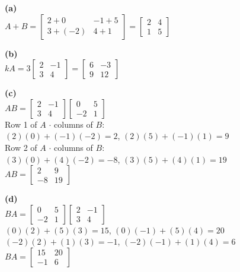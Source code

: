 \begin{solution}
\textbf{(a)} \\
$A + B = \begin{bmatrix} 2+0 & -1+5 \\ 3+(-2) & 4+1 \end{bmatrix} = \begin{bmatrix} 2 & 4 \\ 1 & 5 \end{bmatrix}$

\medskip
\textbf{(b)} \\
$kA = 3\begin{bmatrix} 2 & -1 \\ 3 & 4 \end{bmatrix} = \begin{bmatrix} 6 & -3 \\ 9 & 12 \end{bmatrix}$

\medskip
\textbf{(c)} \\
$AB = \begin{bmatrix} 2 & -1 \\ 3 & 4 \end{bmatrix}\begin{bmatrix} 0 & 5 \\ -2 & 1 \end{bmatrix}$ \\[6pt]
Row 1 of $A$ $\cdot$ columns of $B$: \\
$(2)(0)+(-1)(-2) = 2$, \quad $(2)(5)+(-1)(1) = 9$ \\[3pt]
Row 2 of $A$ $\cdot$ columns of $B$: \\
$(3)(0)+(4)(-2) = -8$, \quad $(3)(5)+(4)(1) = 19$ \\[3pt]
$AB = \begin{bmatrix} 2 & 9 \\ -8 & 19 \end{bmatrix}$

\medskip
\textbf{(d)} \\
$BA = \begin{bmatrix} 0 & 5 \\ -2 & 1 \end{bmatrix}\begin{bmatrix} 2 & -1 \\ 3 & 4 \end{bmatrix}$ \\[6pt]
$(0)(2)+(5)(3) = 15$, \quad $(0)(-1)+(5)(4) = 20$ \\[3pt]
$(-2)(2)+(1)(3) = -1$, \quad $(-2)(-1)+(1)(4) = 6$ \\[3pt]
$BA = \begin{bmatrix} 15 & 20 \\ -1 & 6 \end{bmatrix}$


\end{solution}
